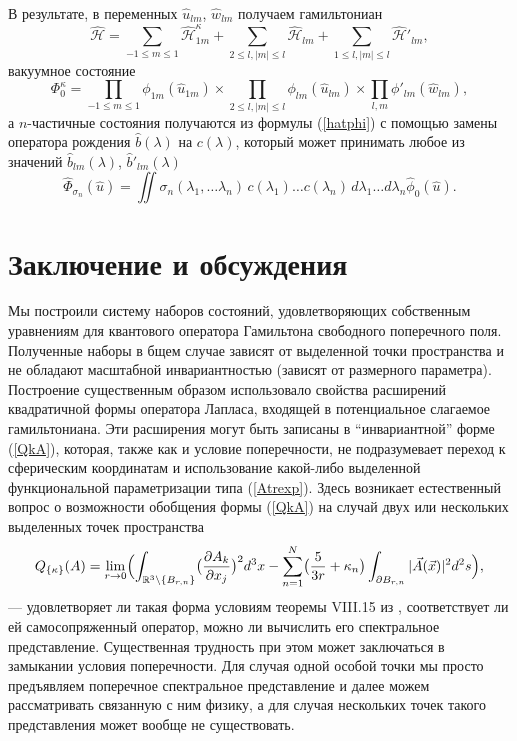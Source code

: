 \documentclass[12pt]{article}
\newcommand{\HH}{\mathscr{H}}
\newcommand{\RR}{\mathbb{R}}
\begin{document}
    В результате, в переменных
$ \hat{u}_{lm} $,
$ \hat{w}_{lm} $
    получаем гамильтониан
\begin{equation*}
    \hat{\HH} = \sum_{-1\leq m\leq 1} \hat{\HH}_{1m}^{\kappa}
	+ \sum_{2\leq l, |m|\leq l} \hat{\HH}_{lm}
	+ \sum_{1\leq l, |m|\leq l} \hat{\HH}'_{lm} ,
\end{equation*}
    вакуумное состояние
\begin{equation*}
    \Phi_{0}^{\kappa} = \prod_{-1\leq m \leq 1} \phi_{1m}(\hat{u}_{1m}) \times
    \prod_{2\leq l, |m|\leq l} \phi_{lm}(\hat{u}_{lm}) \times
	\prod_{l,m} \phi'_{lm}(\hat{w}_{lm}) ,
\end{equation*}
    а
$ n $-частичные состояния получаются из формулы
(\ref{hatphi})
    с помощью замены оператора рождения
$ \hat{b}(\lambda) $ на
$ c(\lambda) $,
    который может принимать любое из значений
$ \hat{b}_{lm}(\lambda) $, $ \hat{b}'_{lm}(\lambda) $
\begin{equation*}
    \hat{\Phi}_{\sigma_{n}}(\hat{u}) = \iint
    \sigma_{n} (\lambda_{1},\ldots \lambda_{n}) \,
	c(\lambda_{1}) \ldots c(\lambda_{n}) \,
    d\lambda_{1} \ldots d\lambda_{n} \hat{\phi}_{0}(\hat{u}) .
\end{equation*}

\section{Заключение и обсуждения}
    Мы построили систему наборов состояний, удовлетворяющих собственным
    уравнениям для квантового оператора Гамильтона свободного поперечного
    поля.
    Полученные наборы в бщем случае
    зависят от выделенной точки пространства и не обладают
    масштабной инвариантностью (зависят от размерного параметра).
    Построение существенным образом использовало свойства расширений
    квадратичной формы оператора Лапласа, входящей в потенциальное слагаемое
    гамильтониана.
    Эти расширения могут быть записаны в ``инвариантной'' форме
(\ref{QkA}),
    которая, также как и условие поперечности, не подразумевает переход
    к сферическим координатам и использование какой-либо выделенной
    функциональной параметризации типа
(\ref{Atrexp}).
    Здесь возникает естественный вопрос о возможности обобщения формы
(\ref{QkA})
    на случай двух или нескольких выделенных точек пространства
\begin{equation*}
        Q_{\{\kappa\}}(A) = \lim_{r\to 0}\Bigl(
    \int_{\RR^{3}\setminus \{B_{r,n}\}}
        \bigl(\frac{\partial A_{k}}{\partial x_{j}}\bigr)^{2} d^{3} x -
    \sum_{n=1}^{N}\bigl(\frac{5}{3r}	+ \kappa_{n}\bigr)
	\int_{\partial B_{r,n}} |\vec{A}(\vec{x})|^{2} d^{2} s \Bigr) ,
\end{equation*}
    --- удовлетворяет ли такая форма условиям теоремы VIII.15 из
\cite{RS1},
    соответствует ли ей самосопряженный оператор, можно ли вычислить его
    спектральное представление. Существенная трудность при этом
    может заключаться в замыкании условия поперечности.
    Для случая одной особой точки мы просто предъявляем поперечное спектральное
    представление и далее можем рассматривать связанную с ним физику,
    а для случая нескольких точек такого представления может вообще
    не существовать.
\end{document}

